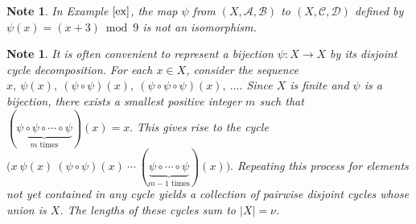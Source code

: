 \documentclass[preprint,11pt]{elsarticle}
\newtheorem{note}[theorem]{Note}
\begin{document}
\begin{note}
    In Example \(\ref{ex}\), the map $\psi$ from  \((X, \mathcal{A}, \mathcal{B})\) to \((X, \mathcal{C}, \mathcal{D})\) defined by $\psi(x)=(x+3)\bmod{9}$ is not an isomorphism.
\end{note}
\begin{note}It is often convenient to represent a bijection
\(\psi:X\to X\) by its disjoint cycle decomposition.
For each \(x\in X\), consider the sequence
\(
x,\ \psi(x),\ (\psi\circ\psi)(x),\ (\psi\circ\psi\circ\psi)(x),\ \ldots.
\)
Since \(X\) is finite and \(\psi\) is a bijection, there exists a
smallest positive integer \(m\) such that
\(
(\underbrace{\psi\circ\psi\circ\cdots\circ\psi}_{m\text{ times}})(x)=x.
\)
This gives rise to the cycle
\(
\bigl(x\ \psi(x)\ (\psi\circ\psi)(x)\ \cdots\
(\underbrace{\psi\circ\cdots\circ\psi}_{m-1\text{ times}})(x)\bigr).
\)
Repeating this process for elements not yet contained in any cycle yields a
collection of pairwise disjoint cycles whose union is \(X\). The
lengths of these cycles sum to \(|X|=\nu\). \end{note}
\end{document}
